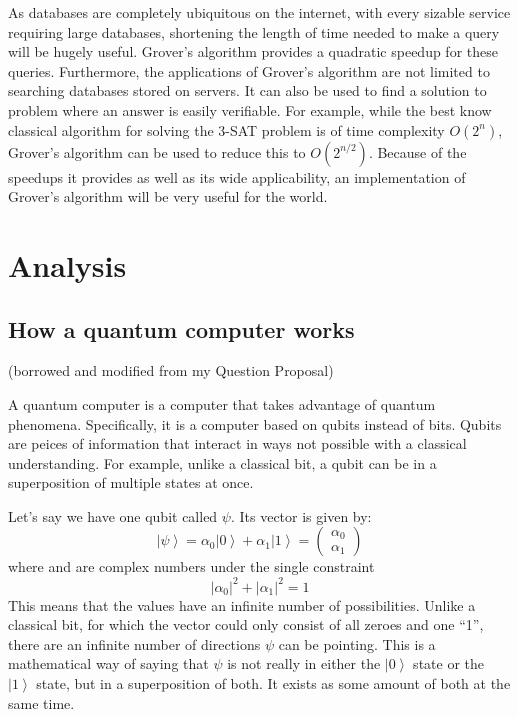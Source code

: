 \documentclass[11pt]{article}
\begin{document}
As databases are completely ubiquitous on the internet, with every sizable service requiring large databases, shortening the length of time needed to make a query will be hugely useful. Grover's algorithm provides a quadratic speedup for these queries. Furthermore, the applications of Grover's algorithm are not limited to searching databases stored on servers. It can also be used to find a solution to problem where an answer is easily verifiable. For example, while the best know classical algorithm for solving the 3-SAT problem is of time complexity $O(2^{n})$, Grover's algorithm can be used to reduce this to $O(2^{n/2})$. Because of the speedups it provides as well as its wide applicability, an implementation of Grover's algorithm will be very useful for the world.

\section{Analysis}

\subsection{How a quantum computer works}
(borrowed and modified from my Question Proposal)

A quantum computer is a computer that takes advantage of quantum phenomena. Specifically, it is a computer based on qubits instead of bits. Qubits are peices of information that interact in ways not possible with a classical understanding. For example, unlike a classical bit, a qubit can be in a superposition of multiple states at once.

Let’s say we have one qubit called $\psi$. Its vector is given by:
$$ \left | \psi \right \rangle=\alpha _{0}\left | 0 \right \rangle+\alpha _{1}\left | 1 \right \rangle=\begin{pmatrix}\alpha_{0}\\ \alpha_{1}\end{pmatrix}$$
where  and  are complex numbers under the single constraint 
$$ \left | \alpha_{0} \right |^{2} + \left | \alpha_{1} \right |^{2}=1$$
This means that the  values have an infinite number of possibilities. Unlike a classical bit, for which the vector could only consist of all zeroes and one “1”, there are an infinite number of directions $\psi$ can be pointing. This is a mathematical way of saying that $\psi$ is not really in either the $\left | 0 \right \rangle$ state or the $\left | 1 \right \rangle$ state, but in a superposition of both. It exists as some amount of both at the same time.
\end{document}
